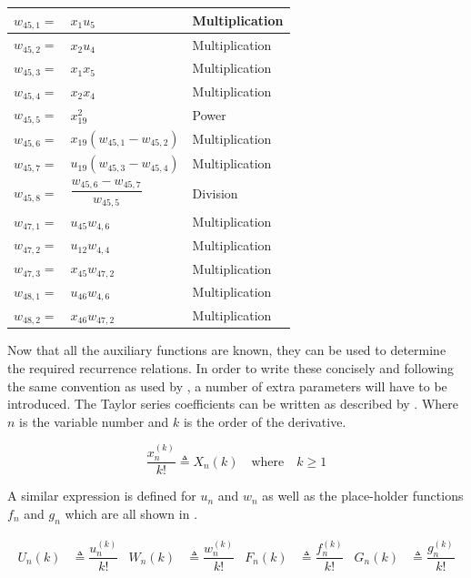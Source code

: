 \begin{longtable}{|p{1.5cm}|l|p{2cm}|}
$w_{45,1}=$ & $ x_{1}u_{5} $ & Multiplication \\ \hline 
$w_{45,2}=$ & $ x_{2}u_{4} $ & Multiplication \\ \hline 
$w_{45,3}=$ & $ x_{1}x_{5} $ & Multiplication \\ \hline 
$w_{45,4}=$ & $ x_{2}x_{4} $ & Multiplication \\ \hline 
$w_{45,5}=$ & $ x_{19}^{2} $ & Power \\ \hline 
$w_{45,6}=$ & $ x_{19}\left(w_{45,1}-w_{45,2}\right) $ & Multiplication \\ \hline 
$w_{45,7}=$ & $ u_{19}\left(w_{45,3}-w_{45,4}\right) $ & Multiplication \\ \hline 
$w_{45,8}=$ & $ \dfrac{w_{45,6}-w_{45,7}}{w_{45,5}} $ & Division \\ \hline 
$w_{47,1}=$ & $ u_{45}w_{4,6} $ & Multiplication \\ \hline 
$w_{47,2}=$ & $ u_{12}w_{4,4} $ & Multiplication \\ \hline 
$w_{47,3}=$ & $ x_{45}w_{47,2} $ & Multiplication \\ \hline 
$w_{48,1}=$ & $ u_{46}w_{4,6} $ & Multiplication \\ \hline 
$w_{48,2}=$ & $ x_{46}w_{47,2} $ & Multiplication \\ \hline 

\end{longtable}

Now that all the auxiliary functions are known, they can be used to determine the required recurrence relations. In order to write these concisely and following the same convention as used by \cite{scott2008high}, a number of extra parameters will have to be introduced. The Taylor series coefficients can be written as described by . Where $n$ is the variable number and $k$ is the order of the derivative.

\begin{equation} \label{eq:tsCoeff}
\dfrac{x_{n}^{\left(k\right)}}{k!} \triangleq X_{n}\left(k\right) \quad \text{where} \quad k \geq 1
\end{equation}

A similar expression is defined for $u_{n}$ and $w_{n}$ as well as the place-holder functions $f_{n}$ and $g_{n}$ which are all shown in .

\begin{align} \label{eq:redDer}
U_{n}\left(k\right)& \triangleq \dfrac{u_{n}^{\left(k\right)}}{k!}
&
W_{n}\left(k\right)& \triangleq \dfrac{w_{n}^{\left(k\right)}}{k!}
&
F_{n}\left(k\right)& \triangleq \dfrac{f_{n}^{\left(k\right)}}{k!}
&
G_{n}\left(k\right)& \triangleq \dfrac{g_{n}^{\left(k\right)}}{k!}
\end{align}



